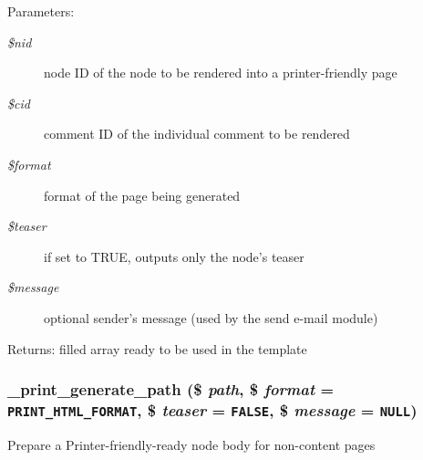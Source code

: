 \begin{Desc}
\item[Parameters:]
\begin{description}
\item[{\em \$nid}]node ID of the node to be rendered into a printer-friendly page \item[{\em \$cid}]comment ID of the individual comment to be rendered \item[{\em \$format}]format of the page being generated \item[{\em \$teaser}]if set to TRUE, outputs only the node's teaser \item[{\em \$message}]optional sender's message (used by the send e-mail module) \end{description}
\end{Desc}
\begin{Desc}
\item[Returns:]filled array ready to be used in the template \end{Desc}
\hypertarget{print_8pages_8inc_034f39dad1e6de6b874b38bc9ba6df44}{
\subsubsection[{\_\-print\_\-generate\_\-path}]{\setlength{\rightskip}{0pt plus 5cm}\_\-print\_\-generate\_\-path (\$ {\em path}, \/  \$ {\em format} = {\tt PRINT\_\-HTML\_\-FORMAT}, \/  \$ {\em teaser} = {\tt FALSE}, \/  \$ {\em message} = {\tt NULL})}}
\label{print_8pages_8inc_034f39dad1e6de6b874b38bc9ba6df44}


Prepare a Printer-friendly-ready node body for non-content pages


